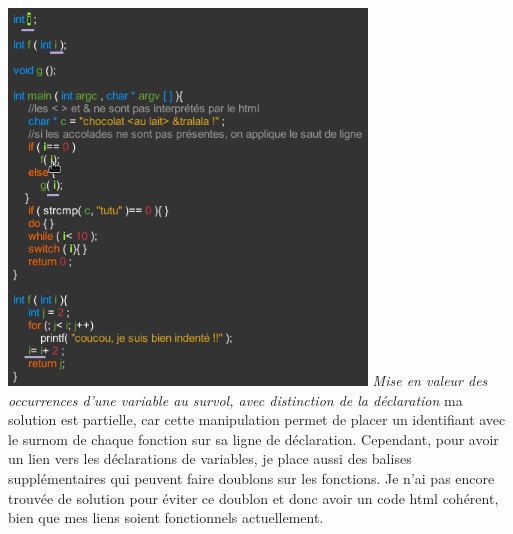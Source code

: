 	\includegraphics[height=10cm]{site/survol.png} 
	\newline
\textit{Mise en valeur des occurrences d'une variable au survol, avec distinction de la déclaration}
\newline 
ma solution est partielle, car cette manipulation permet de placer un identifiant avec le surnom de chaque fonction sur sa ligne de déclaration. Cependant, pour avoir un lien vers les déclarations de variables, je place aussi des balises supplémentaires qui peuvent faire doublons sur les fonctions. Je n'ai pas encore trouvée de solution pour éviter ce doublon et donc avoir un code html cohérent, bien que mes liens soient fonctionnels actuellement. \newline

